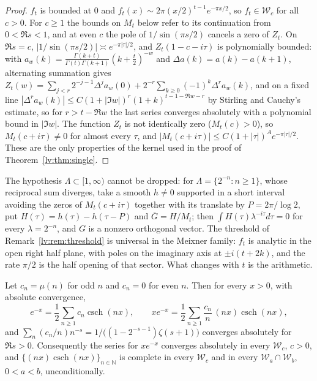\begin{proof}
$f_t$ is bounded at $0$ and $f_t(x)\sim2\pi(x/2)^{t-1}e^{-\pi x/2}$, so $f_t\in\mathcal W_c$ for all $c>0$. For $c\ge1$ the bounds on $M_t$ below refer to its continuation from $0<\Re s<1$, and at even $c$ the pole of $1/\sin(\pi s/2)$ cancels a zero of $Z_t$. On $\Re s=c$, $|1/\sin(\pi s/2)|\asymp e^{-\pi|\tau|/2}$, and $Z_t(1-c-i\tau)$ is polynomially bounded: with $a_w(k)=\frac{\Gamma(k+t)}{\Gamma(t)\Gamma(k+1)}(k+\frac t2)^{-w}$ and $\Delta a(k)=a(k)-a(k+1)$, alternating summation gives $Z_t(w)=\sum_{j<r}2^{-j-1}\Delta^ja_w(0)+2^{-r}\sum_{k\ge0}(-1)^k\Delta^ra_w(k)$, and on a fixed line $|\Delta^ra_w(k)|\le C(1+|\Im w|)^r(1+k)^{t-1-\Re w-r}$ by Stirling and Cauchy's estimate, so for $r>t-\Re w$ the last series converges absolutely with a polynomial bound in $|\Im w|$. The function $Z_t$ is not identically zero ($M_t(c)>0$), so $M_t(c+i\tau)\ne0$ for almost every $\tau$, and $|M_t(c+i\tau)|\le C(1+|\tau|)^Ae^{-\pi|\tau|/2}$. These are the only properties of the kernel used in the proof of Theorem~\ref{lv:thm:single}.
\end{proof}

The hypothesis $\Lambda\subset[1,\infty)$ cannot be dropped: for $\Lambda=\{2^{-n}:n\ge1\}$, whose reciprocal sum diverges, take a smooth $h\ne0$ supported in a short interval avoiding the zeros of $M_t(c+i\tau)$ together with its translate by $P=2\pi/\log2$, put $H(\tau)=h(\tau)-h(\tau-P)$ and $\overline{G}=H/M_t$; then $\int H(\tau)\lambda^{-i\tau}d\tau=0$ for every $\lambda=2^{-n}$, and $G$ is a nonzero orthogonal vector. The threshold of Remark~\ref{lv:rem:threshold} is universal in the Meixner family: $f_t$ is analytic in the open right half plane, with poles on the imaginary axis at $\pm i(t+2k)$, and the rate $\pi/2$ is the half opening of that sector. What changes with $t$ is the arithmetic.

\begin{theorem}\label{lv:thm:t2}
Let $c_n=\mu(n)$ for odd $n$ and $c_n=0$ for even $n$. Then for every $x>0$, with absolute convergence,
\begin{equation}\label{lv:eq:csch}
e^{-x}=\frac12\sum_{n\ge1}c_n\operatorname{csch}(nx),\qquad xe^{-x}=\frac12\sum_{n\ge1}\frac{c_n}n\,(nx)\operatorname{csch}(nx),
\end{equation}
and $\sum_n(c_n/n)n^{-s}=1/\bigl((1-2^{-s-1})\zeta(s+1)\bigr)$ converges absolutely for $\Re s>0$. Consequently the series for $xe^{-x}$ converges absolutely in every $\mathcal W_c$, $c>0$, and $\{(nx)\operatorname{csch}(nx)\}_{n\in\mathbb N}$ is complete in every $\mathcal W_c$ and in every $\mathcal W_a\cap\mathcal W_b$, $0<a<b$, unconditionally.
\end{theorem}

